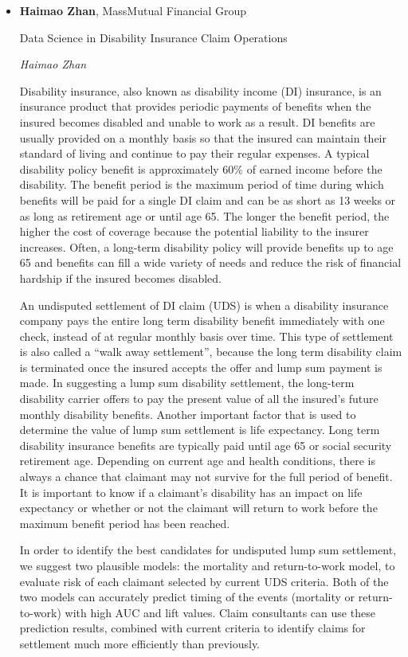 \begin{itemize}
\item \textbf{Haimao Zhan}, MassMutual Financial Group

Data Science in Disability Insurance Claim Operations

\emph{\footnotesize Haimao Zhan}

Disability insurance, also known as disability income (DI) insurance, is an insurance product that provides periodic payments of benefits when the insured becomes disabled and unable to work as a result. DI benefits are usually provided on a monthly basis so that the insured can maintain their standard of living and continue to pay their regular expenses. A typical disability policy benefit is approximately 60\% of earned income before the disability. The benefit period is the maximum period of time during which benefits will be paid for a single DI claim and can be as short as 13 weeks or as long as retirement age or until age 65. The longer the benefit period, the higher the cost of coverage because the potential liability to the insurer increases. Often, a long-term disability policy will provide benefits up to age 65 and benefits can fill a wide variety of needs and reduce the risk of financial hardship if the insured becomes disabled. 

An undisputed settlement of DI claim (UDS) is when a disability insurance company pays the entire long term disability benefit immediately with one check, instead of at regular monthly basis over time. This type of settlement is also called a ``walk away settlement'', because the long term disability claim is terminated once the insured accepts the offer and lump sum payment is made. In suggesting a lump sum disability settlement, the long-term disability carrier offers to pay the present value of all the insured's future monthly disability benefits. Another important factor that is used to determine the value of lump sum settlement is life expectancy. Long term disability insurance benefits are typically paid until age 65 or social security retirement age. Depending on current age and health conditions, there is always a chance that claimant may not survive for the full period of benefit. It is important to know if a claimant's disability has an impact on life expectancy or whether or not the claimant will return to work before the maximum benefit period has been reached.

In order to identify the best candidates for undisputed lump sum settlement, we suggest two plausible models: the mortality and return-to-work model, to evaluate risk of each claimant selected by current UDS criteria. Both of the two models can accurately predict timing of the events (mortality or return-to-work) with high AUC and lift values. Claim consultants can use these prediction results, combined with current criteria to identify claims for settlement much more efficiently than previously.

\end{itemize}

